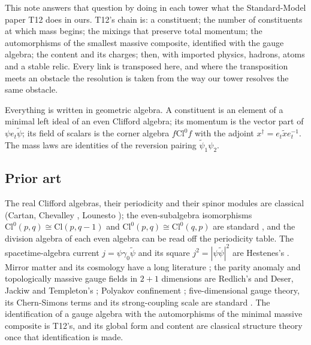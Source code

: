 \documentclass[11pt]{article}
\theoremstyle{definition}
\theoremstyle{plain}
\providecommand{\Cl}{}\renewcommand{\Cl}{\mathrm{Cl}}
\providecommand{\rev}{}\renewcommand{\rev}[1]{\widetilde{#1}}
\begin{document}
This note answers that question by doing in each tower what the Standard-Model paper T12 \cite{ButlerT12} does in ours. T12's chain is: a constituent; the number of constituents at which mass begins; the mixings that preserve total momentum; the automorphisms of the smallest massive composite, identified with the gauge algebra; the content and its charges; then, with imported physics, hadrons, atoms and a stable relic. Every link is transposed here, and where the transposition meets an obstacle the resolution is taken from the way our tower resolves the same obstacle.

Everything is written in geometric algebra. A constituent is an element of a minimal left ideal of an even Clifford algebra; its momentum is the vector part of $\psi e_{t} \rev{\psi}$; its field of scalars is the corner algebra $f \Cl^{0} f$ with the adjoint $x^{\dagger} = e_{t}\rev{x}e_{t}^{-1}$. The mass laws are identities of the reversion pairing $\rev{\psi}_{1}\psi_{2}$.

\subsection*{Prior art}
\label{c:note.dark-tower-matter.setting-prior-art}
The real Clifford algebras, their periodicity and their spinor modules are classical (Cartan, Chevalley \cite{Chevalley1954}, Lounesto \cite{Lounesto2001}); the even-subalgebra isomorphisms $\Cl^{0}(p,q) \cong \Cl(p,q-1)$ and $\Cl^{0}(p,q) \cong \Cl^{0}(q,p)$ are standard \cite{Porteous1995, Lounesto2001}, and the division algebra of each even algebra can be read off the periodicity table. The spacetime-algebra current $j = \psi\gamma_{0}\rev{\psi}$ and its square $j^{2} = |\psi\rev{\psi}|^{2}$ are Hestenes's \cite{Hestenes1966, DoranLasenby2003}. Mirror matter and its cosmology have a long literature \cite{FootMirror2004, RouxCline2020}; the parity anomaly and topologically massive gauge fields in $2+1$ dimensions are Redlich's and Deser, Jackiw and Templeton's \cite{Redlich1984, DJT1982}; Polyakov confinement \cite{Polyakov1977}; five-dimensional gauge theory, its Chern-Simons terms and its strong-coupling scale are standard \cite{IMS1997, CLP2000}. The identification of a gauge algebra with the automorphisms of the minimal massive composite is T12's, and its global form and content are classical structure theory once that identification is made.
\end{document}
